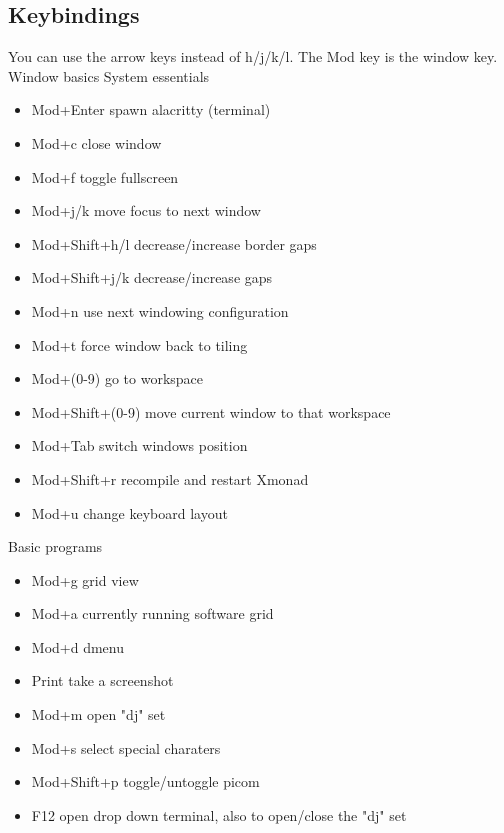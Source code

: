 \documentclass{article}
\begin{document}
\subsection*{Keybindings}
You can use the arrow keys instead of h/j/k/l. The Mod key is the window key.
\newline Window basics \hfill System essentials
\renewcommand{\labelitemi}{\textbullet}
\renewcommand\labelitemii{\textbullet}
\begin{multicols}{2}
\begin{itemize}
    \item Mod+Enter spawn alacritty (terminal)
    \item Mod+c close window
    \item Mod+f toggle fullscreen
    \item Mod+j/k move focus to next window
    \item Mod+Shift+h/l decrease/increase border gaps
    \item Mod+Shift+j/k decrease/increase gaps
    \item Mod+n use next windowing configuration
    \item Mod+t force window back to tiling
    \item Mod+(0-9) go to workspace
    \item Mod+Shift+(0-9) move current window to that workspace
    \item Mod+Tab switch windows position
    \item Mod+Shift+r recompile and restart Xmonad
    \item Mod+u change keyboard layout
\end{itemize}
\hfill Basic programs
\begin{itemize}
    \item Mod+g grid view
    \item Mod+a currently running software grid
    \item Mod+d dmenu
    \item Print take a screenshot
    \item Mod+m open "dj" set
    \item Mod+s select special charaters
    \item Mod+Shift+p toggle/untoggle picom
    \item F12 open drop down terminal, also to open/close the "dj" set
\end{itemize}
\end{multicols}
\end{document}
